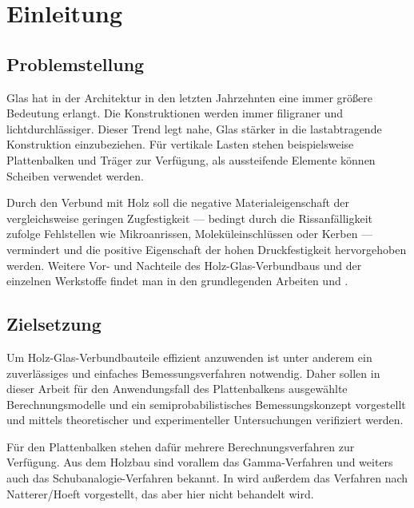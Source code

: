 \chapter{Einleitung}


\section{Problemstellung}
Glas hat in der Architektur in den letzten Jahrzehnten eine immer größere Bedeutung erlangt. Die Konstruktionen werden immer filigraner und lichtdurchlässiger. Dieser Trend legt nahe, Glas stärker in die lastabtragende Konstruktion einzubeziehen. Für vertikale Lasten stehen beispielsweise Plattenbalken und Träger zur Verfügung, als aussteifende Elemente können Scheiben verwendet werden.

Durch den Verbund mit Holz soll die negative Materialeigenschaft der vergleichsweise geringen Zugfestigkeit --- bedingt durch die Rissanfälligkeit zufolge Fehlstellen wie Mikroanrissen, Moleküleinschlüssen oder Kerben \cite{Kr04} --- vermindert und die positive Eigenschaft der hohen Druckfestigkeit hervorgehoben werden. Weitere Vor- und Nachteile des Holz-Glas-Verbundbaus und der einzelnen Werkstoffe findet man in den grundlegenden Arbeiten \cite{Kr04} und \cite{Ha99}.




\section{Zielsetzung}

Um Holz-Glas-Verbundbauteile effizient anzuwenden ist unter anderem ein zuverlässiges und einfaches Bemessungsverfahren notwendig. Daher sollen in dieser Arbeit für den Anwendungsfall des Plattenbalkens  ausgewählte Berechnungsmodelle und ein semiprobabilistisches Bemessungskonzept vorgestellt und mittels theoretischer und experimenteller Untersuchungen verifiziert werden.

Für den Plattenbalken stehen dafür mehrere Berechnungsverfahren zur Verfügung. Aus dem Holzbau sind vorallem das Gamma-Verfahren und weiters auch das Schubanalogie-Verfahren bekannt. In \cite{Ha99} wird außerdem das Verfahren nach Natterer/Hoeft vorgestellt, das aber hier nicht behandelt wird.
